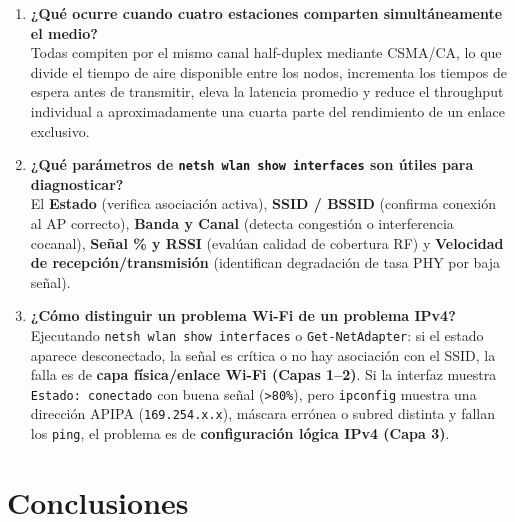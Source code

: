 \documentclass[11pt, a4paper]{article}
\begin{document}
\begin{enumerate}
    \item \textbf{¿Qué ocurre cuando cuatro estaciones comparten simultáneamente el medio?} \\
    Todas compiten por el mismo canal half-duplex mediante CSMA/CA, lo que divide el tiempo de aire disponible entre los nodos, incrementa los tiempos de espera antes de transmitir, eleva la latencia promedio y reduce el throughput individual a aproximadamente una cuarta parte del rendimiento de un enlace exclusivo.
    \item \textbf{¿Qué parámetros de \texttt{netsh wlan show interfaces} son útiles para diagnosticar?} \\
    El \textbf{Estado} (verifica asociación activa), \textbf{SSID / BSSID} (confirma conexión al AP correcto), \textbf{Banda y Canal} (detecta congestión o interferencia cocanal), \textbf{Señal \% y RSSI} (evalúan calidad de cobertura RF) y \textbf{Velocidad de recepción/transmisión} (identifican degradación de tasa PHY por baja señal).
    \item \textbf{¿Cómo distinguir un problema Wi-Fi de un problema IPv4?} \\
    Ejecutando \texttt{netsh wlan show interfaces} o \texttt{Get-NetAdapter}: si el estado aparece desconectado, la señal es crítica o no hay asociación con el SSID, la falla es de \textbf{capa física/enlace Wi-Fi (Capas 1--2)}. Si la interfaz muestra \texttt{Estado: conectado} con buena señal (\texttt{>80\%}), pero \texttt{ipconfig} muestra una dirección APIPA (\texttt{169.254.x.x}), máscara errónea o subred distinta y fallan los \texttt{ping}, el problema es de \textbf{configuración lógica IPv4 (Capa 3)}.
\end{enumerate}

\section{Conclusiones}
\end{document}
